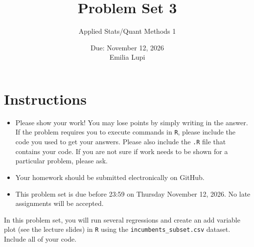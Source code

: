 \documentclass[12pt,letterpaper]{article}
\title{Problem Set 3}
\date{Due: November 12, 2026\\[0.5em]Emilia Lupi}
\author{Applied Stats/Quant Methods 1}
\begin{document}
	\maketitle
	\section*{Instructions}
	\begin{itemize}
		\item Please show your work! You may lose points by simply writing in the answer. If the problem requires you to execute commands in \texttt{R}, please include the code you used to get your answers. Please also include the \texttt{.R} file that contains your code. If you are not sure if work needs to be shown for a particular problem, please ask.
		\item Your homework should be submitted electronically on GitHub.
		\item This problem set is due before 23:59 on Thursday November 12, 2026. No late assignments will be accepted.
		
	\end{itemize}
	
	\vspace{.25cm}
	
	\noindent In this problem set, you will run several regressions and create an add variable plot (see the lecture slides) in \texttt{R} using the \texttt{incumbents\_subset.csv} dataset. Include all of your code.
	
	\vspace{.5cm}
\end{document}
